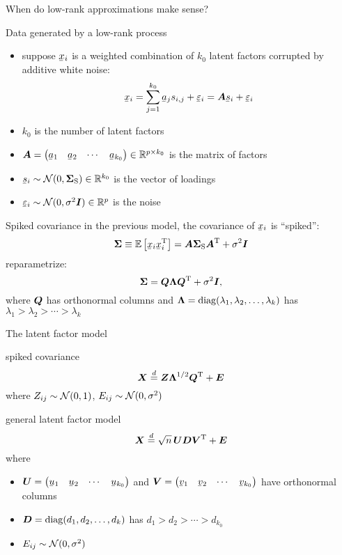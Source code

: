 \documentclass{beamer}
\begin{document}
\begin{frame}{When do low-rank approximations make sense?}
  \begin{block}{Data generated by a low-rank process}
    \begin{itemize}
    \item suppose $\vx_i$ is a weighted combination of $k_0$ latent factors corrupted by additive white noise:
      \[ \vx_i = \sum_{j=1}^{k_0} \va_j s_{i,j} + \vepsilon_i = \mA \vs_i + \vepsilon_i \]
    \item $k_0$ is the number of latent factors
    \item $\mA = \left(\begin{matrix} \va_1 & \va_2 & \cdots & \va_{k_0}\end{matrix}\right) \in \reals^{p \times k_0}$ is the matrix of factors
    \item $\vs_i \sim \Normal(0, \mSigma_\text{S}) \in \reals^{k_0}$ is the vector of loadings 
    \item $\vepsilon_i \sim \Normal(0, \sigma^2 \mI) \in \reals^p$ is the noise
    \end{itemize}
  \end{block}
\end{frame}

\begin{frame}{Spiked covariance}
  in the previous model, the covariance of $\vx_i$ is ``spiked'':
  \[
    \mSigma \equiv \E\left[ \vx_i \vx_i^\trans \right] = \mA \mSigma_\text{S} \mA^\trans + \sigma^2 \mI
  \]
  reparametrize:
  \[
    \boldsymbol{\Sigma} = \boldsymbol{Q} \boldsymbol{\Lambda} \boldsymbol{Q}^{\mathrm{T}} + \sigma^2 \boldsymbol{I},
  \]
  where $\boldsymbol{Q}$ has orthonormal columns and $\boldsymbol{\Lambda} = \operatorname*{diag}( \lambda_1, \lambda_2, \ldots, \lambda_k)$ has $\lambda_1 > \lambda_2 > \cdots > \lambda_k$
\end{frame}
\begin{frame}{The latent factor model}
  \begin{block}{spiked covariance}
  \[
    \boldsymbol{X} \overset{d}{=} \boldsymbol{Z} \boldsymbol{\Lambda}^{1/2} \boldsymbol{Q}^{\mathrm{T}} + \boldsymbol{E}
  \]
  where $Z_{ij} \sim \mathcal{N}(0, 1)$, $E_{ij} \sim \mathcal{N}(0, \sigma^2)$
  \end{block}
  \begin{block}{general latent factor model}
  \[
    \boldsymbol{X} \overset{d}{=} \sqrt{n} \, \boldsymbol{U} \boldsymbol{D} \boldsymbol{V}^{\mathrm{T}} + \boldsymbol{E}
  \]
  where
  \begin{itemize}
  \item $\mU = \left(\begin{matrix} \vu_1 & \vu_2 & \cdots & \vu_{k_0}\end{matrix}\right)$
  and $\mV = \left(\begin{matrix} \vv_1 & \vv_2 & \cdots & \vv_{k_0}\end{matrix}\right)$ have orthonormal columns
  \item $\boldsymbol{D} = \operatorname*{diag}(d_1, d_2, \ldots, d_k)$ has $d_1 > d_2 > \cdots > d_{k_0}$
  \item $E_{ij} \sim \mathcal{N}(0, \sigma^2)$
  \end{itemize}
  \end{block}
\end{frame}
\end{document}
